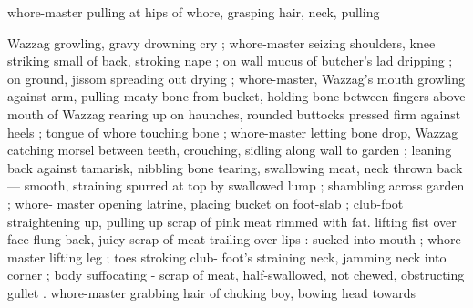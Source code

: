 whore-master pulling at hips of whore, grasping hair, neck, pulling

Wazzag growling, gravy drowning cry ; whore-master seizing
shoulders, knee striking small of back, stroking nape ; on wall
mucus of butcher's lad dripping ; on ground, jissom spreading out
drying ; whore-master, Wazzag's mouth growling against arm, pulling
meaty bone from bucket, holding bone between fingers above mouth
of Wazzag rearing up on haunches, rounded buttocks pressed firm
against heels ; tongue of whore touching bone ; whore-master letting
bone drop, Wazzag catching morsel between teeth, crouching, sidling
along wall to garden ; leaning back against tamarisk, nibbling bone
tearing, swallowing meat, neck thrown back — smooth, straining
spurred at top by swallowed lump ; shambling across garden ; whore-
master opening latrine, placing bucket on foot-slab ; club-foot
straightening up, pulling up scrap of pink meat rimmed with fat.
lifting fist over face flung back, juicy scrap of meat trailing over lips
: sucked into mouth ; whore-master lifting leg ; toes stroking club-
foot's straining neck, jamming neck into corner ; body suffocating -
scrap of meat, half-swallowed, not chewed, obstructing gullet .
whore-master grabbing hair of choking boy, bowing head towards


